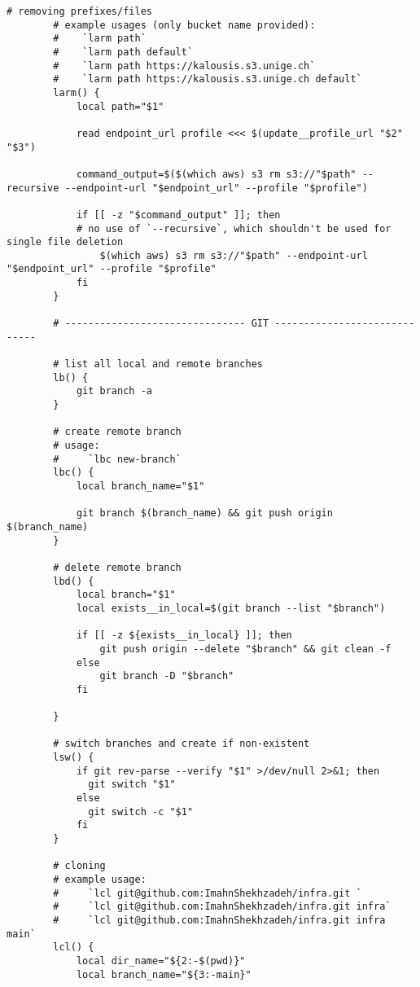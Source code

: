 \documentclass[12pt, a4paper]{scrbook}
\numberwithin{equation}{section}
\theoremstyle{definition}
\theoremstyle{definition}
\begin{document}
\begin{lstlisting}[style=mystylebash, label=alg:bashrc_contents, xleftmargin=\parindent]
		# removing prefixes/files
		# example usages (only bucket name provided):
		#    `larm path`
		#    `larm path default`
		#    `larm path https://kalousis.s3.unige.ch`
		#    `larm path https://kalousis.s3.unige.ch default`
		larm() {
			local path="$1"
			
			read endpoint_url profile <<< $(update__profile_url "$2" "$3")
			
			command_output=$($(which aws) s3 rm s3://"$path" --recursive --endpoint-url "$endpoint_url" --profile "$profile")
			
			if [[ -z "$command_output" ]]; then
			# no use of `--recursive`, which shouldn't be used for single file deletion
				$(which aws) s3 rm s3://"$path" --endpoint-url "$endpoint_url" --profile "$profile"
			fi
		}
		
		# ------------------------------- GIT -----------------------------
		
		# list all local and remote branches
		lb() {
			git branch -a
		}
		
		# create remote branch
		# usage:
		#     `lbc new-branch`
		lbc() {
			local branch_name="$1"

			git branch $(branch_name) && git push origin $(branch_name)
		}
		
		# delete remote branch
		lbd() {
			local branch="$1" 
			local exists__in_local=$(git branch --list "$branch")
			
			if [[ -z ${exists__in_local} ]]; then
				git push origin --delete "$branch" && git clean -f
			else
				git branch -D "$branch"
			fi

		}

		# switch branches and create if non-existent
		lsw() {                                                                                                           
			if git rev-parse --verify "$1" >/dev/null 2>&1; then                                                            
			  git switch "$1"                                                                                               
			else                                                                                                            
			  git switch -c "$1"                                                                                            
			fi                                                                                                              
		}
	
		# cloning
		# example usage:
		#     `lcl git@github.com:ImahnShekhzadeh/infra.git `
		#     `lcl git@github.com:ImahnShekhzadeh/infra.git infra`
		#     `lcl git@github.com:ImahnShekhzadeh/infra.git infra main`
		lcl() {
			local dir_name="${2:-$(pwd)}"
			local branch_name="${3:-main}"
			

\end{lstlisting}
\end{document}
